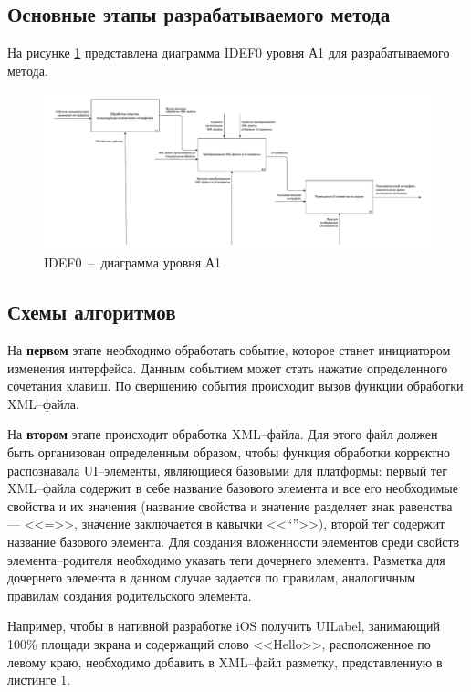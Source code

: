 \subsection{Основные этапы разрабатываемого метода}

На рисунке \ref{fig:a1} представлена диаграмма IDEF0 уровня А1 для разрабатываемого метода.

\begin{figure}[!htb]
	\centering
	\includegraphics[scale=0.4]{img/A1.pdf}
	\caption{IDEF0~--~диаграмма уровня А1}
	\label{fig:a1}
\end{figure}

\subsection{Схемы алгоритмов}

На \textbf{первом} этапе необходимо обработать событие, которое станет инициатором изменения интерфейса.
Данным событием может стать нажатие определенного сочетания клавиш.
По свершению события происходит вызов функции обработки XML--файла.
  

На \textbf{втором} этапе происходит обработка XML--файла. 
Для этого файл должен быть организован определенным образом, чтобы функция обработки корректно распознавала UI--элементы, являющиеся базовыми для платформы: первый тег XML--файла содержит в себе название базового элемента и все его необходимые свойства и их значения (название свойства и значение разделяет знак равенства --- <<=>>, значение заключается в кавычки <<``''>>), второй тег содержит название базового элемента.
Для создания вложенности элементов среди свойств элемента--родителя необходимо указать теги дочернего элемента.
Разметка для дочернего элемента в данном случае задается по правилам, аналогичным правилам создания родительского элемента.

Например, чтобы в нативной разработке iOS получить UILabel, занимающий 100\% площади экрана и содержащий слово <<Hello>>, расположенное по левому краю, необходимо добавить в XML--файл разметку, представленную в листинге 1.

